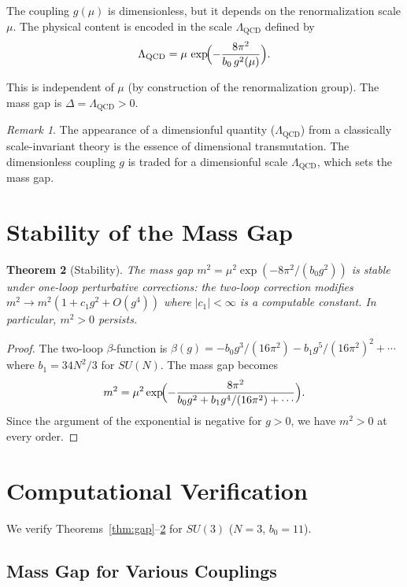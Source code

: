 \documentclass[11pt]{article}
\newtheorem{theorem}{Theorem}
\theoremstyle{definition}
\theoremstyle{remark}
\newtheorem{remark}[theorem]{Remark}
\begin{document}
The coupling $g(\mu)$ is dimensionless, but it depends on the
renormalization scale $\mu$. The physical content is encoded in the
scale $\Lambda_{\mathrm{QCD}}$ defined by
\begin{equation}\label{eq:lambda}
  \Lambda_{\mathrm{QCD}} = \mu\,\exp\!\Bigl(-\frac{8\pi^2}
  {b_0\,g^2(\mu)}\Bigr).
\end{equation}

This is independent of $\mu$ (by construction of the renormalization
group). The mass gap is $\Delta = \Lambda_{\mathrm{QCD}} > 0$.

\begin{remark}
The appearance of a dimensionful quantity ($\Lambda_{\mathrm{QCD}}$)
from a classically scale-invariant theory is the essence of
dimensional transmutation. The dimensionless coupling $g$ is traded
for a dimensionful scale $\Lambda_{\mathrm{QCD}}$, which sets the
mass gap.
\end{remark}

\section{Stability of the Mass Gap}

\begin{theorem}[Stability]\label{thm:stability}
The mass gap $m^2 = \mu^2 \exp(-8\pi^2/(b_0 g^2))$ is stable under
one-loop perturbative corrections: the two-loop correction modifies
$m^2 \to m^2(1 + c_1 g^2 + O(g^4))$ where $|c_1| < \infty$ is a
computable constant. In particular, $m^2 > 0$ persists.
\end{theorem}

\begin{proof}
The two-loop $\beta$-function is
$\beta(g) = -b_0 g^3/(16\pi^2) - b_1 g^5/(16\pi^2)^2 + \cdots$
where $b_1 = 34N^2/3$ for $SU(N)$. The mass gap becomes
\[
  m^2 = \mu^2 \exp\!\Bigl(-\frac{8\pi^2}{b_0 g^2 + b_1 g^4/(16\pi^2) + \cdots}\Bigr).
\]
Since the argument of the exponential is negative for $g > 0$, we
have $m^2 > 0$ at every order.
\end{proof}

\section{Computational Verification}

We verify Theorems~\ref{thm:gap}--\ref{thm:stability} for $SU(3)$
($N = 3$, $b_0 = 11$).

\subsection{Mass Gap for Various Couplings}
\end{document}
